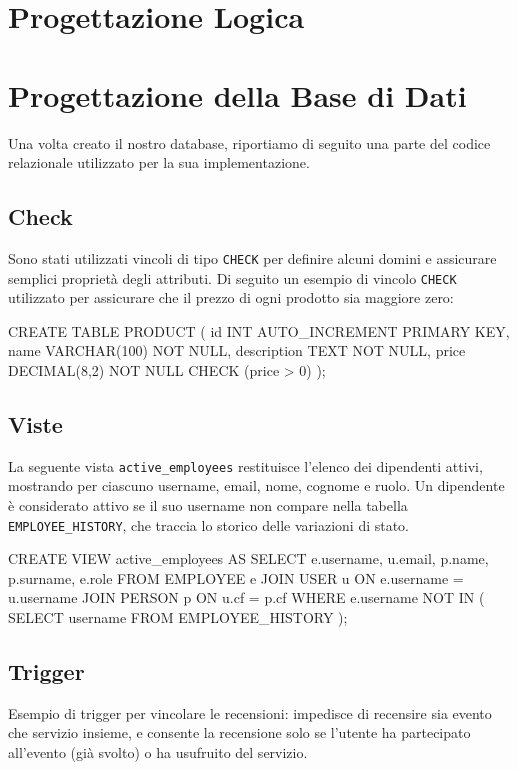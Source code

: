 \documentclass[a4paper,12pt]{report}
\begin{document}
\chapter{Progettazione Logica}

\chapter{Progettazione della Base di Dati}
Una volta creato il nostro database, riportiamo di seguito una parte del codice relazionale 
utilizzato per la sua implementazione.

\section{Check}
Sono stati utilizzati vincoli di tipo \texttt{CHECK} per definire alcuni domini e assicurare 
semplici proprietà degli attributi. Di seguito un esempio di vincolo \texttt{CHECK} utilizzato 
per assicurare che il prezzo di ogni prodotto sia maggiore zero:
\begin{sqlcode}[caption={},label={lst:check}]
CREATE TABLE PRODUCT (
    id INT AUTO_INCREMENT PRIMARY KEY,
    name VARCHAR(100) NOT NULL,
    description TEXT NOT NULL,
    price DECIMAL(8,2) NOT NULL CHECK (price > 0)
);
\end{sqlcode}

\section{Viste}
La seguente vista \texttt{active\_employees} restituisce l'elenco dei dipendenti attivi, 
mostrando per ciascuno username, email, nome, cognome e ruolo. Un dipendente è considerato 
attivo se il suo username non compare nella tabella \texttt{EMPLOYEE\_HISTORY}, che traccia 
lo storico delle variazioni di stato.

\begin{sqlcode}[caption={},label={lst:view}]
CREATE VIEW active_employees AS
SELECT 
    e.username,
    u.email,
    p.name,
    p.surname,
    e.role
FROM EMPLOYEE e
JOIN USER u ON e.username = u.username
JOIN PERSON p ON u.cf = p.cf
WHERE e.username NOT IN (
    SELECT username FROM EMPLOYEE_HISTORY
);
\end{sqlcode}

\section{Trigger}
Esempio di trigger per vincolare le recensioni: impedisce di recensire sia evento che servizio 
insieme, e consente la recensione solo se l'utente ha partecipato all'evento (già svolto) o ha 
usufruito del servizio.
\end{document}
